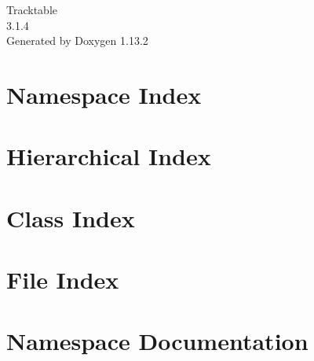 \documentclass[twoside]{book}
\newcommand{\+}{\discretionary{\mbox{\scriptsize$\hookleftarrow$}}{}{}}
\newcommand{\clearemptydoublepage}{%
    \newpage{\pagestyle{empty}\cleardoublepage}%
  }
\begin{document}
  \raggedbottom
    \hypersetup{pageanchor=false,
                bookmarksnumbered=true,
                pdfencoding=unicode
               }
  \begin{titlepage}
  \vspace*{7cm}
  \begin{center}%
  {\Large Tracktable}\\
  [1ex]\large 3.\+1.\+4 \\
  \vspace*{1cm}
  {\large Generated by Doxygen 1.13.2}\\
  \end{center}
  \end{titlepage}
  \clearemptydoublepage
  \tableofcontents
  \clearemptydoublepage
  \hypersetup{pageanchor=true}

\chapter{Namespace Index}

\chapter{Hierarchical Index}

\chapter{Class Index}

\chapter{File Index}

\chapter{Namespace Documentation}


\end{document}
